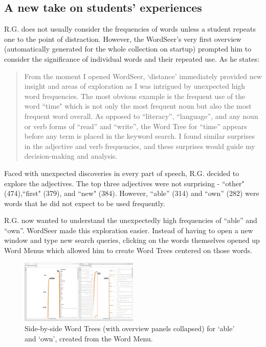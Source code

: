 \documentclass{sig-alternate}
\begin{document}
 \subsection{A new take on students' experiences}

R.G. does not usually consider the frequencies of words unless a student repeats one to the point of distraction. However, the WordSeer's very first overview (automatically generated for the whole collection on startup) prompted him to consider the significance of individual words and their repeated use.  As he states:
\begin{quote}
From the moment I opened WordSeer, `distance' immediately provided new insight and areas of exploration as I was intrigued by unexpected high word frequencies.  The most obvious example is the frequent use of the word ``time" which is not only the most frequent noun but also the most frequent word overall.  As opposed to ``literacy'', ``language'', and any noun or verb forms of ``read'' and ``write'', the Word Tree for ``time'' appears before any term is placed in the keyword search.   I found similar surprises in the adjective and verb frequencies, and these surprises would guide my decision-making and analysis.
\end{quote}
Faced with unexpected discoveries in every part of speech, R.G. decided to explore the adjectives. The top three adjectives were not surprising - ``other" (474),``first" (379), and ``new" (384).  However,  ``able'' (314) and ``own'' (282) were words that he did not expect to be used frequently.

R.G. now wanted to understand the unexpectedly high frequencies of ``able'' and ``own''. WordSeer made this exploration easier. Instead of having to open a new window and type new search queries, clicking on the words themselves opened up Word Menus which allowed him to create Word Trees centered on those words.

\begin{figure}[h!]
\includegraphics[width=0.5\textwidth]{fig/rex/04.png}
\caption{ Side-by-side Word Trees (with overview panels collapsed) for `able' and `own', created from the Word Menu. \label{fig:rex04}}
\end{figure}
\end{document}
